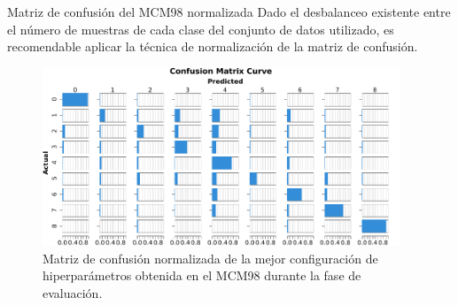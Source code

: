 \begin{frame}{Matriz de confusión del MCM98 normalizada}
Dado el desbalanceo existente entre el número de muestras de cada clase del conjunto de datos utilizado, es recomendable aplicar la técnica de normalización de la matriz de confusión.%


\begin{figure}[H]
    \centering
    \includegraphics[width=0.95\textwidth]{../Memoria/img/evaluacion/matrices_confusion/MCNorm_EVAL_MCM98.pdf}
    \caption{Matriz de confusión normalizada de la mejor configuración de hiperparámetros obtenida en el MCM98 durante la fase de evaluación.}
    \label{fig:MCNorm_EVAL_MCM98}
\end{figure}

\end{frame}


